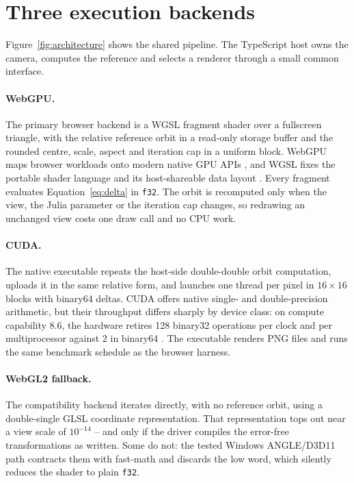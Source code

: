 \documentclass[10pt,a4paper]{article}
\begin{document}
\section{Three execution backends}

Figure~\ref{fig:architecture} shows the shared pipeline. The TypeScript host
owns the camera, computes the reference and selects a renderer through a small
common interface.

\paragraph{WebGPU.}
The primary browser backend is a WGSL fragment shader over a fullscreen
triangle, with the relative reference orbit in a read-only storage buffer and
the rounded centre, scale, aspect and iteration cap in a uniform block. WebGPU
maps browser workloads onto modern native GPU APIs \cite{webgpu2026}, and WGSL
fixes the portable shader language and its host-shareable data layout
\cite{wgsl2026}. Every fragment evaluates Equation~\ref{eq:delta} in
\texttt{f32}. The orbit is recomputed only when the view, the Julia parameter
or the iteration cap changes, so redrawing an unchanged view costs one draw
call and no CPU work.

\paragraph{CUDA.}
The native executable repeats the host-side double-double orbit computation,
uploads it in the same relative form, and launches one thread per pixel in
\(16\times16\) blocks with binary64 deltas. CUDA offers native single- and
double-precision arithmetic, but their throughput differs sharply by device
class: on compute capability 8.6, the hardware retires 128 binary32 operations
per clock and per multiprocessor against 2 in binary64 \cite{cuda2025}. The
executable renders PNG files and runs the same benchmark schedule as the
browser harness.

\paragraph{WebGL2 fallback.}
The compatibility backend iterates directly, with no reference orbit, using a
double-single GLSL coordinate representation. That representation tops out near
a view scale of \(10^{-14}\) -- and only if the driver compiles the error-free
transformations as written. Some do not: the tested Windows ANGLE/D3D11 path
contracts them with fast-math and discards the low word, which silently reduces
the shader to plain \texttt{f32}.
\end{document}
